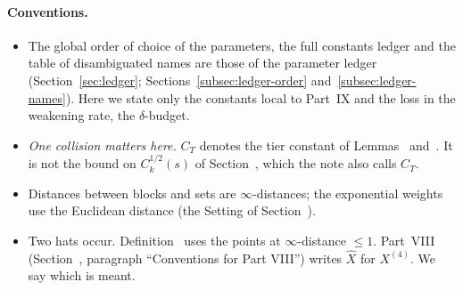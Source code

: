 \paragraph{Conventions.}
\begin{itemize}
\item The global order of choice of the parameters, the full constants ledger and the table of disambiguated names are those of the parameter ledger (Section~\ref{sec:ledger}; Sections~\ref{subsec:ledger-order} and~\ref{subsec:ledger-names}). Here we state only the constants local to Part~IX and the loss in the weakening rate, the $\delta$-budget.
\item \emph{One collision matters here.} $C_T$ denotes the tier constant of Lemmas~ and~. It is not the bound on $C_k^{1/2}(s)$ of Section~, which the note also calls $C_T$.
\item Distances between blocks and sets are $\infty$-distances; the exponential weights use the Euclidean distance (the Setting of Section~).
\item Two hats occur. Definition~ uses the points at $\infty$-distance $\le1$. Part~VIII (Section~, paragraph ``Conventions for Part VIII'') writes $\hat X$ for $X^{(4)}$. We say which is meant.
\end{itemize}

